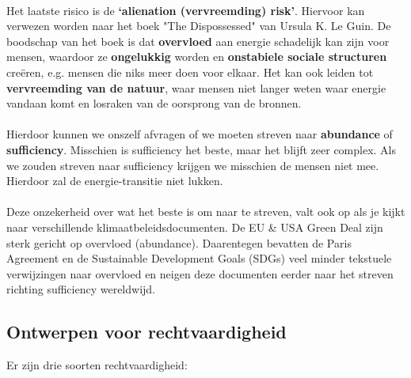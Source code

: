 \documentclass[../summary.tex]{subfiles}
\begin{document}
	\ \\
	Het laatste risico is de \textbf{`alienation (vervreemding) risk'}. Hiervoor kan verwezen worden naar het boek "The Dispossessed" van Ursula K. Le Guin. De boodschap van het boek is dat \textbf{overvloed} aan energie schadelijk kan zijn voor mensen, waardoor ze \textbf{ongelukkig} worden en \textbf{onstabiele sociale structuren} creëren, e.g. mensen die niks meer doen voor elkaar. Het kan ook leiden tot \textbf{vervreemding van de natuur}, waar mensen niet langer weten waar energie vandaan komt en losraken van de oorsprong van de bronnen.\\
	\\
	Hierdoor kunnen we onszelf afvragen of we moeten streven naar \textbf{abundance} of \textbf{sufficiency}. Misschien is sufficiency het beste, maar het blijft zeer complex. Als we zouden streven naar sufficiency krijgen we misschien de mensen niet mee. Hierdoor zal de energie-transitie niet lukken.\\
	\\
	Deze onzekerheid over wat het beste is om naar te streven, valt ook op als je kijkt naar verschillende klimaatbeleidsdocumenten. De EU \& USA Green Deal zijn sterk gericht op overvloed (abundance). Daarentegen bevatten de Paris Agreement en de Sustainable Development Goals (SDGs) veel minder tekstuele verwijzingen naar overvloed en neigen deze documenten eerder  naar het streven richting sufficiency wereldwijd.
	\newpage
	
	\subsection{Ontwerpen voor rechtvaardigheid}
	
	Er zijn drie soorten rechtvaardigheid:
	
\end{document}
